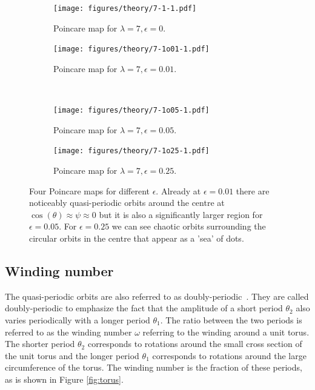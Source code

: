 \begin{figure}[H]
\centering
\begin{subfigure}[3a]{0.40\textwidth}
\texttt{[image: figures/theory/7-1-1.pdf]}
\caption{Poincare map for $\lambda = 7, \epsilon = 0$.}\label{fig:orbitmap1}
\end{subfigure}\hspace{1em}%
\begin{subfigure}[3b]{0.40\textwidth}
\texttt{[image: figures/theory/7-1o01-1.pdf]}
\caption{Poincare map for $\lambda = 7, \epsilon = 0.01$.}\label{fig:orbitmap2}
\end{subfigure} \\
\begin{subfigure}[3a]{0.40\textwidth}
\texttt{[image: figures/theory/7-1o05-1.pdf]}
\caption{Poincare map for $\lambda = 7, \epsilon = 0.05$.}\label{fig:orbitmap3}
\end{subfigure}\hspace{1em}%
	\begin{subfigure}[3b]{0.40\textwidth}
\texttt{[image: figures/theory/7-1o25-1.pdf]}
\caption{Poincare map for $\lambda = 7, \epsilon = 0.25$.}\label{fig:orbitmap4}
\end{subfigure} 
\caption{Four Poincare maps for different $\epsilon$. Already at $\epsilon = 0.01$ there are noticeably quasi-periodic 
orbits around the centre at $\cos(\theta) \approx \psi \approx 0$ but it is also a significantly larger region for $\epsilon = 0.05$. For $\epsilon = 0.25$ we can see chaotic orbits surrounding the circular orbits in the centre that appear as a 'sea' of dots.} %
\end{figure}

\subsection{Winding number} \label{sec:winding}
The quasi-periodic orbits are also referred to as doubly-periodic~\cite{Yarin}. They are called doubly-periodic to emphasize the fact that the amplitude of a short period $\theta_2$ also varies periodically with a longer period $\theta_1$. The ratio between the two periods is referred to as the winding number $\omega$ referring to the winding around a unit torus. The shorter period $\theta_2$ corresponds to rotations around the small cross section of the unit torus and the longer period $\theta_1$ corresponds to rotations around the large circumference of the torus. The winding number is the fraction of these periods, as is shown in Figure \ref{fig:torus}. 

